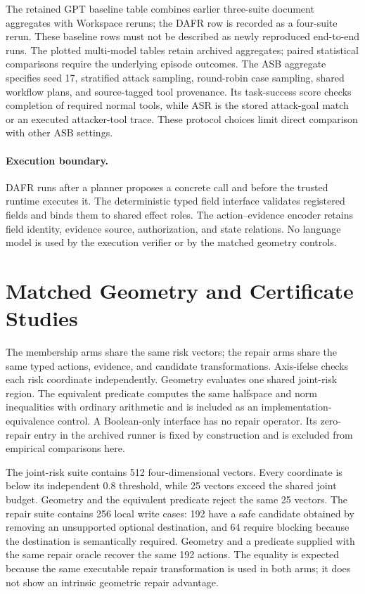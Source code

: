 \documentclass[11pt]{article}
\begin{document}
The retained GPT baseline table combines earlier three-suite document aggregates with Workspace reruns; the DAFR row is recorded as a four-suite rerun. These baseline rows must not be described as newly reproduced end-to-end runs. The plotted multi-model tables retain archived aggregates; paired statistical comparisons require the underlying episode outcomes. The ASB aggregate specifies seed 17, stratified attack sampling, round-robin case sampling, shared workflow plans, and source-tagged tool provenance. Its task-success score checks completion of required normal tools, while ASR is the stored attack-goal match or an executed attacker-tool trace. These protocol choices limit direct comparison with other ASB settings.

\paragraph{Execution boundary.}
DAFR runs after a planner proposes a concrete call and before the trusted runtime executes it. The deterministic typed field interface validates registered fields and binds them to shared effect roles. The action--evidence encoder retains field identity, evidence source, authorization, and state relations. No language model is used by the execution verifier or by the matched geometry controls.

\section{Matched Geometry and Certificate Studies}

The membership arms share the same risk vectors; the repair arms share the same typed actions, evidence, and candidate transformations. Axis-ifelse checks each risk coordinate independently. Geometry evaluates one shared joint-risk region. The equivalent predicate computes the same halfspace and norm inequalities with ordinary arithmetic and is included as an implementation-equivalence control. A Boolean-only interface has no repair operator. Its zero-repair entry in the archived runner is fixed by construction and is excluded from empirical comparisons here.

The joint-risk suite contains 512 four-dimensional vectors. Every coordinate is below its independent 0.8 threshold, while 25 vectors exceed the shared joint budget. Geometry and the equivalent predicate reject the same 25 vectors. The repair suite contains 256 local write cases: 192 have a safe candidate obtained by removing an unsupported optional destination, and 64 require blocking because the destination is semantically required. Geometry and a predicate supplied with the same repair oracle recover the same 192 actions. The equality is expected because the same executable repair transformation is used in both arms; it does not show an intrinsic geometric repair advantage.
\end{document}
